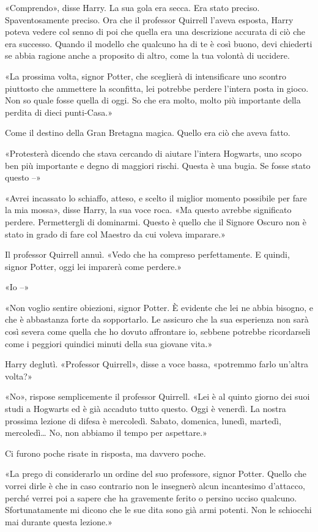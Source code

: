 «Comprendo», disse Harry. La sua gola era secca. Era stato preciso. Spaventosamente preciso. Ora che il professor Quirrell l’aveva esposta, Harry poteva vedere col senno di poi che quella era una descrizione accurata di ciò che era successo. Quando il modello che qualcuno ha di te è così buono, devi chiederti se abbia ragione anche a proposito di altro, come la tua volontà di uccidere.

«La prossima volta, signor Potter, che sceglierà di intensificare uno scontro piuttosto che ammettere la sconfitta, lei potrebbe perdere l’intera posta in gioco. Non so quale fosse quella di oggi. So che era molto, molto più importante della perdita di dieci punti-Casa.»

Come il destino della Gran Bretagna magica. Quello era ciò che aveva fatto.

«Protesterà dicendo che stava cercando di aiutare l’intera Hogwarts, uno scopo ben più importante e degno di maggiori rischi. Questa è una bugia. Se fosse stato questo –»

«Avrei incassato lo schiaffo, atteso, e scelto il miglior momento possibile per fare la mia mossa», disse Harry, la sua voce roca. «Ma questo avrebbe significato perdere. Permettergli di dominarmi. Questo è quello che il Signore Oscuro non è stato in grado di fare col Maestro da cui voleva imparare.»

Il professor Quirrell annuì. «Vedo che ha compreso perfettamente. E quindi, signor Potter, oggi lei imparerà come perdere.»

«Io –»

«Non voglio sentire obiezioni, signor Potter. È evidente che lei ne abbia bisogno, e che è abbastanza forte da sopportarlo. Le assicuro che la sua esperienza non sarà così severa come quella che ho dovuto affrontare io, sebbene potrebbe ricordarseli come i peggiori quindici minuti della sua giovane vita.»

Harry deglutì. «Professor Quirrell», disse a voce bassa, «potremmo farlo un’altra volta?»

«No», rispose semplicemente il professor Quirrell. «Lei è al quinto giorno dei suoi studi a Hogwarts ed è già accaduto tutto questo. Oggi è venerdì. La nostra prossima lezione di difesa è mercoledì. Sabato, domenica, lunedì, martedì, mercoledì… No, non abbiamo il tempo per aspettare.»

Ci furono poche risate in risposta, ma davvero poche.

«La prego di considerarlo un ordine del suo professore, signor Potter. Quello che vorrei dirle è che in caso contrario non le insegnerò alcun incantesimo d’attacco, perché verrei poi a sapere che ha gravemente ferito o persino ucciso qualcuno. Sfortunatamente mi dicono che le sue dita sono già armi potenti. Non le schiocchi mai durante questa lezione.»

